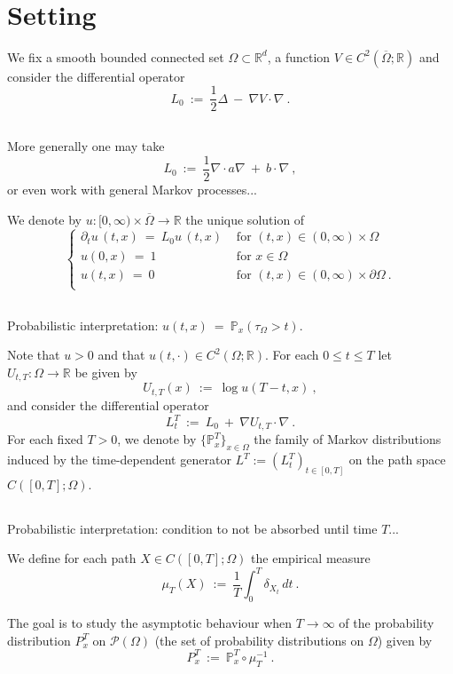 \documentclass[12pt,a4paper]{article}
\date{\today}
\newcommand{\pecetta}[1]{
$\phantom .$
\bigskip
\par\noindent
\colorbox{light}{\begin{minipage}{12.3cm}#1\end{minipage}}
\bigskip
\par\noindent
}
\newcommand{\mb}[1]{\mathbb{#1}}
\newcommand{\mc}[1]{\mathcal{#1}}
\newcommand{\ra}{\rightarrow}
\begin{document}
 


 
\

\section{Setting}
\noindent
We fix a smooth bounded connected set  $\Omega\subset \mb R^d$, a function $V\in C^2(\overline\Omega; \mb R)$
and consider the differential operator
\[     L_0    \   :=    \       \frac 12 \Delta \  -  \   \nabla V \cdot \nabla      \   .    \]
\pecetta{More generally one may take
\[     L_0    \   :=    \       \frac 12 \nabla \cdot a \nabla  \  +  \   b  \cdot \nabla      \   ,    \]
or even work with general Markov processes...
}
We denote by $u: [0, \infty)\times \overline{\Omega} \ra \mb R $ the unique solution of 
\[
\begin{cases} 
\partial_t u  \, (t,x) \  =   \     L_0 u  \,  (t,x)              & \text{ for }   (t,x)\in (0, \infty) \times \Omega  \\
u(0,x)   \  =   \   1      & \text{ for }   x \in \Omega\\
u(t,x)   \  =  \   0   & \text{ for }   (t,x) \in (0, \infty) \times \partial \Omega     \  .     \\
\end{cases}    \]
\pecetta{   Probabilistic interpretation:  $u(t,x) \  =  \  \mb P_x(\tau_\Omega>t)$.}
Note that $u>0$ and that $u(t, \cdot)\in C^2 (\Omega;\mb R)$. 
For each $0\leq t \leq T$  let $U_{t, T}:  \Omega \ra \mb R$ be given by 
\[   U_{t,T} (x)  \  :=   \      \log u (T-t, x)  \  ,   \]
and consider the differential operator
\[    L_{t}^T  \  :=  \    L_0    \   +  \   \nabla  U_{t,T}  \cdot \nabla    \  .    \]
For each fixed $T>0$, we denote by $\{\mb P^T_{x}\}_{x\in \Omega}$ the family of Markov distributions  
induced by the time-dependent generator   $ L^T := (L_{t}^T)_{t\in [0,T]}$
on the path space $C([0,T]; \Omega)$. 

\pecetta{Probabilistic interpretation: condition to not be absorbed until time $T$...}


 
\noindent
We define for each  path $X\in C([0,T]; \Omega)$
the empirical measure
\[   \mu_T(X)  \  :=  \    \frac 1T \int_0^T  \delta_{X_t}   \, dt    \  .   \]

\noindent
The goal is to study the asymptotic behaviour when $T\ra \infty$ of the probability distribution
$ P^T_{x}$ on $\mc P (\Omega)$ (the set of probability distributions on $\Omega$)  given by 
\[    P^T_{x}    \  :=   \    \mb P^T_{x} \circ \mu^{-1}_T     \  .     \]
\end{document}
